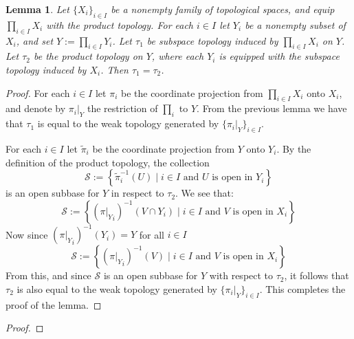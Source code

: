 \documentclass[11pt,a4paper]{article}
\theoremstyle{definition}
\theoremstyle{plain}
\newtheorem{lemma}[theorem]{Lemma}
\newcommand{\set}[2]{ \left\{ #1 \mid #2 \right\} }
\begin{document}
  \begin{lemma}
    Let $\{X_i\}_{i \in I}$ be a nonempty family of topological spaces, 
    and equip $\prod_{i \in I}{X_i}$ with the product topology. For each 
    $i \in I$ let $Y_i$ be a nonempty subset of $X_i$, and set 
    $Y := \prod_{i \in I}{Y_i}$. Let $\tau_1$ be subspace topology induced 
    by $\prod_{i \in I}{X_i}$ on $Y$. Let $\tau_2$ be the product topology 
    on $Y$, where each $Y_i$ is equipped with the subspace topology induced 
    by $X_i$. Then $\tau_1 = \tau_2$.
  \end{lemma}
  \begin{proof}
    For each $i \in I$ let $\pi_i$ be the coordinate projection from 
    $\prod_{i \in I}{X_i}$ onto $X_i$, and denote by $\pi_i\vert_Y$ the 
    restriction of $\prod_i$ to $Y$. From the previous lemma we have
    that $\tau_1$ is equal to the weak topology generated by 
    $\{\pi_i \vert_Y\}_{i \in I}$. 
    
    For each $i \in I$ let $\tilde{\pi}_i$ be the coordinate projection from 
    $Y$ onto $Y_i$. By the definition of the product topology, the collection
    \[
      \mathcal{S} := \set{\tilde{\pi}_{i}^{-1}(U)}
      {\text{$i \in I$ and $U$ is open in $Y_i$}}
    \]
    is an open subbase for $Y$ in respect to $\tau_2$. We see that:
    \[
      \mathcal{S} := \set{({\pi \vert_Y}_{i})^{-1}(V \cap Y_i)}
      {\text{$i \in I$ and $V$ is open in $X_i$}}
    \]
    Now since $({\pi \vert_Y}_{i})^{-1}(Y_i) = Y$ for all $i \in I$
    \[
      \mathcal{S} := \set{({\pi \vert_Y}_{i})^{-1}(V)}
      {\text{$i \in I$ and $V$ is open in $X_i$}}
    \]
    From this, and since $\mathcal{S}$ is an open subbase for $Y$ with 
    respect to $\tau_2$, it follows that $\tau_2$ is also equal to the weak 
    topology generated by $\{\pi_i \vert_Y\}_{i \in I}$. This completes the
    proof of the lemma.
  \end{proof}
  \begin{proof}
    
  \end{proof}
\end{document}
